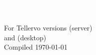 
\cleardoublepage
\thispagestyle{empty} 
\includegraphics{Images/pixel.png}

\newpage
\thispagestyle{empty} 

\includegraphics{Images/pixel.png}\\[187mm] 
\vfill
{
\large For Tellervo versions {\serverversionnumber} (server)\\
and {\desktopversionnumber} (desktop)\\[2mm]
Compiled \today\\[4mm]
}
